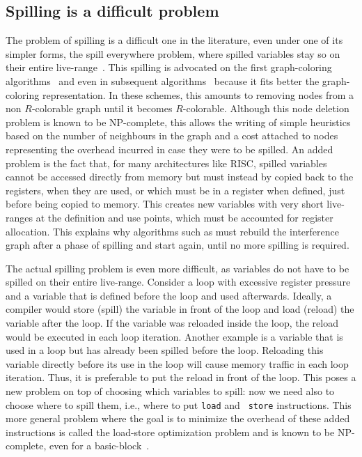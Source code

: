 {\subsection{Spilling is a difficult problem}

The problem of spilling is a difficult one in the literature, even under one of 
its simpler forms, the spill everywhere problem, where spilled variables stay 
so on their entire live-range~\cite{todo}. This spilling is advocated on the 
first graph-coloring algorithms~\cite{Chaitin81} and even in subsequent 
algorithms~\cite{IRC} because it fits better the graph-coloring representation. 
In these schemes, this amounts to removing nodes from a non $R$-colorable graph 
until it becomes $R$-colorable. Although this node deletion problem is known to 
be NP-complete, this allows the writing of simple heuristics based on the 
number of neighbours in the graph and a cost attached to nodes representing the 
overhead incurred in case they were to be spilled. An added problem is the fact 
that, for many architectures like RISC, spilled variables cannot be accessed 
directly from memory but must instead by copied back to the registers, when 
they are used, or which must be in a register when defined, just before being 
copied to memory. This creates new variables with very short live-ranges at the 
definition and use points, which must be accounted for register allocation. 
This explains why algorithms such as \irc must rebuild the interference graph 
after a phase of spilling and start again, until no more spilling is required.


The actual spilling problem is even more difficult, as variables do not have to 
be spilled on their entire live-range.
Consider a loop with excessive register pressure and a variable that is defined 
before the loop and used afterwards. Ideally, a compiler would store (spill) 
the variable in front of the loop and load (reload) the variable after the 
loop. If the variable was reloaded inside the loop, the reload would be 
executed in each loop iteration. Another example is a variable that is used in 
a loop but has already been spilled before the loop. Reloading this variable 
directly before its use in the loop will cause memory traffic in each loop 
iteration. Thus, it is preferable to put the reload in front of the loop.
This poses a new problem on top of choosing which variables to spill: now we 
need also to choose where to spill them, i.e., where to put {\tt load} and {\tt 
store} instructions. This more general problem where the goal is to minimize 
the overhead of these added instructions is called the load-store optimization 
problem and is known to be NP-complete, even for a 
basic-block~\cite{Liberatore00}.  


}
